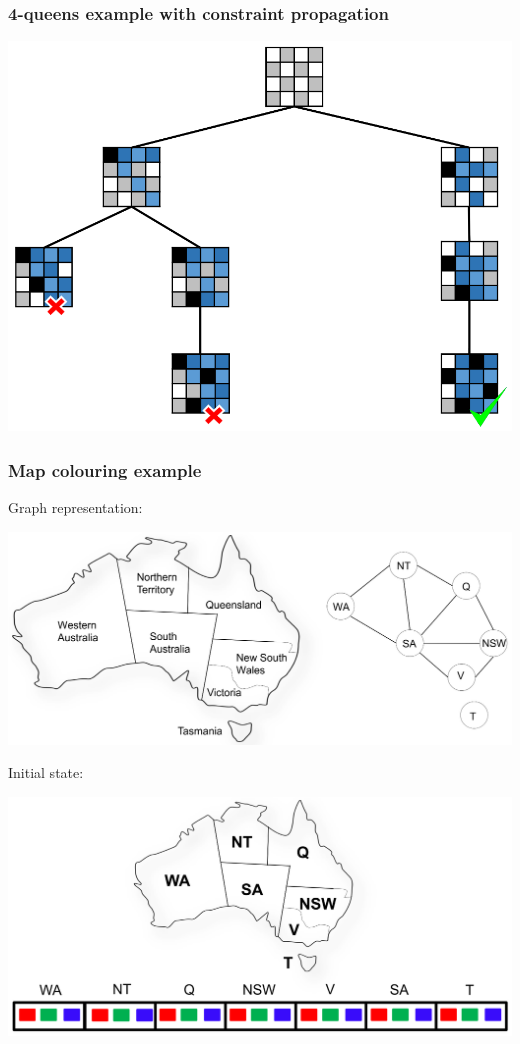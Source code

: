 \documentclass[11pt]{article}
\begin{document}
\subsubsection{4-queens example with constraint propagation}
\label{sec:org8477111}
\begin{center}
\includegraphics[width=.9\linewidth]{./images/4-queens-example-with-constraint-propagation.png}
\end{center}

 \newpage
\subsubsection{Map colouring example}
\label{sec:org0fb65e0}
Graph representation:
\begin{center}
\includegraphics[width=.9\linewidth]{./images/map-colouring-example-graph-representation.png}
\end{center}

Initial state:
\begin{center}
\includegraphics[width=.9\linewidth]{./images/map-colouring-example-initial-state.png}
\end{center}
\end{document}
